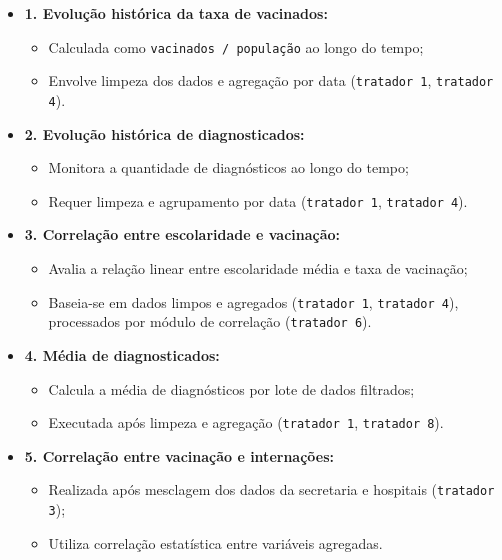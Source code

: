 \documentclass[a4paper,12pt]{article}
\begin{document}
\begin{itemize}
    \item \textbf{1. Evolução histórica da taxa de vacinados:} 
    \begin{itemize}
        \item Calculada como \texttt{vacinados / população} ao longo do tempo;
        \item Envolve limpeza dos dados e agregação por data (\texttt{tratador 1}, \texttt{tratador 4}).
    \end{itemize}

    \item \textbf{2. Evolução histórica de diagnosticados:}
    \begin{itemize}
        \item Monitora a quantidade de diagnósticos ao longo do tempo;
        \item Requer limpeza e agrupamento por data (\texttt{tratador 1}, \texttt{tratador 4}).
    \end{itemize}

    \item \textbf{3. Correlação entre escolaridade e vacinação:}
    \begin{itemize}
        \item Avalia a relação linear entre escolaridade média e taxa de vacinação;
        \item Baseia-se em dados limpos e agregados (\texttt{tratador 1}, \texttt{tratador 4}), processados por módulo de correlação (\texttt{tratador 6}).
    \end{itemize}

    \item \textbf{4. Média de diagnosticados:}
    \begin{itemize}
        \item Calcula a média de diagnósticos por lote de dados filtrados;
        \item Executada após limpeza e agregação (\texttt{tratador 1}, \texttt{tratador 8}).
    \end{itemize}

    \item \textbf{5. Correlação entre vacinação e internações:}
    \begin{itemize}
        \item Realizada após mesclagem dos dados da secretaria e hospitais (\texttt{tratador 3});
        \item Utiliza correlação estatística entre variáveis agregadas.
    \end{itemize}


\end{itemize}
\end{document}
